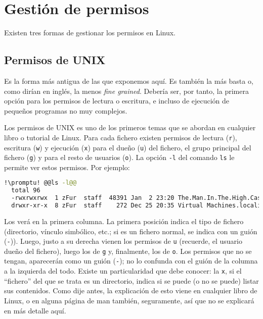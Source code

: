 \section{Gestión de permisos}\label{sec:permisos}
Existen tres formas de gestionar los permisos en Linux.

\subsection{Permisos de UNIX}
Es la forma más antigua de las que exponemos aquí. Es también la más basta o, como dirían en inglés, la menos
\foreignlanguage{english}{\textit{fine grained}}. Debería ser, por tanto, la primera opción para los permisos de
lectura o escritura, e incluso de ejecución de pequeños programas no muy complejos.

Los permisos de UNIX es uno de los primeros temas que se abordan en cualquier libro o tutorial de Linux. Para
cada fichero existen permisos de lectura (\lstinline!r!), escritura (\lstinline!w!) y ejecución (\lstinline!x!)
para el dueño (\lstinline!u!) del fichero, el grupo principal del fichero (\lstinline!g!) y para el resto de
usuarios (\lstinline!o!). La opción \lstinline!-l! del comando \lstinline!ls! le permite ver estos permisos. Por
ejemplo:

\begin{lstlisting}[gobble=2,language=bash,style=bashinteract,escapechar=!]
  !\promptu! @@ls -l@@
  total 96
  -rwxrwxrwx  1 zFur  staff  48391 Jan  2 23:20 The.Man.In.The.High.Castle.S01E08.WEBRip.x264-TASTETV.srt
  drwxr-xr-x  8 zFur  staff    272 Dec 25 20:35 Virtual Machines.localized
\end{lstlisting}

\noindent Los verá en la primera columna. La primera posición indica el tipo de fichero (directorio, vínculo
simbólico, etc.; si es un fichero normal, se indica con un guión (\lstinline!-!)). Luego, justo a su derecha
vienen los permisos de \lstinline!u! (recuerde, el usuario dueño del fichero), luego los de \lstinline!g! y,
finalmente, los de \lstinline!o!. Los permisos que no se tengan, aparecerán como un guión (\lstinline!-!); no lo
confunda con el guión de la columna a la izquierda del todo. Existe un particularidad que debe conocer: la
\lstinline!x!, si el ``fichero'' del que se trata es un directorio, indica si se puede (o no se puede) listar
sus contenidos. Como dije antes, la explicación de esto viene en cualquier libro de Linux, o en alguna página de
man también, seguramente, así que no se explicará en más detalle aquí.

